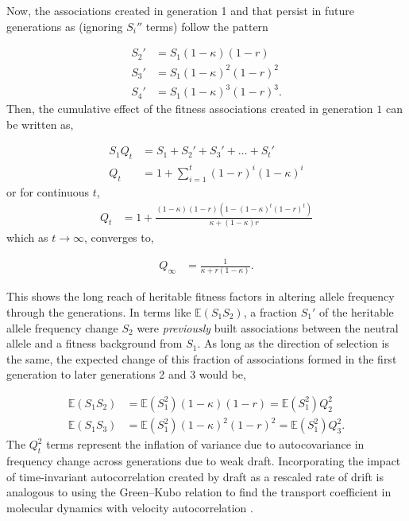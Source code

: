 \documentclass[11pt]{article}
\newcommand{\E}{\mathbb{E}}
\begin{document}
Now, the associations created in generation 1 and that persist in future
generations as (ignoring $S_i''$ terms) follow the pattern

\begin{align}
  S_{2}' &= S_1 (1-\kappa)(1-r) \nonumber \\
  S_{3}' &= S_1 (1-\kappa)^2(1-r)^2 \nonumber \\
  S_{4}' &= S_1 (1-\kappa)^3(1-r)^3.
\end{align}
%
Then, the cumulative effect of the fitness associations created in generation
$1$ can be written as,

\begin{align}
  \label{eq:qterm}
  S_1 Q_t &= S_1 + S_2' + S_3' + \ldots + S_t' \nonumber \\
  Q_t &= 1 + \sum_{i=1}^t (1-r)^i(1-\kappa)^i
\end{align}
%
or for continuous $t$, 
%
\begin{align}
  \label{eq:q_t}
  Q_t &= 1+\frac{(1-\kappa) (1-r) \left(1-(1-\kappa)^t (1-r)^t\right)}{\kappa+(1-\kappa)r}
\end{align}
which as $t \to \infty$, converges to,

\begin{align}
  \label{eq:Qinf}
  Q_\infty &= \frac{1}{\kappa + r(1-\kappa)}.
\end{align}

This shows the long reach of heritable fitness factors in altering allele
frequency through the generations. In terms like $\E(S_1 S_2)$, a fraction
$S_1'$ of the heritable allele frequency change $S_2$ were \emph{previously}
built associations between the neutral allele and a fitness background from
$S_1$. As long as the direction of selection is the same, the expected change
of this fraction of associations formed in the first generation to later
generations 2 and 3 would be,

\begin{align}
  \E(S_1 S_2) &= \E(S_1^2) (1-\kappa)(1-r) = \E(S_1^2) Q_2^2 \nonumber \\
  \E(S_1 S_3) &= \E(S_1^2) (1-\kappa)^2(1-r)^2 = \E(S_1^2) Q_3^2.
\end{align}
%
The $Q_t^2$ terms represent the inflation of variance due to autocovariance in
frequency change across generations due to weak draft. Incorporating the impact
of time-invariant autocorrelation created by draft as a rescaled rate of drift
is analogous to using the Green--Kubo relation to find the transport
coefficient in molecular dynamics with velocity autocorrelation
\parencite{Green1954-kl,Kubo1957-va}.
\end{document}
